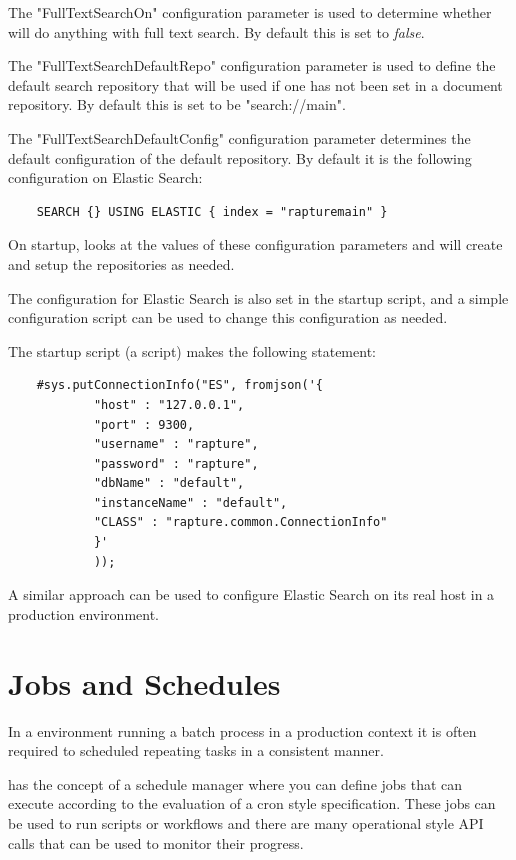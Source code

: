 The "FullTextSearchOn" configuration parameter is used to determine whether \Rapture will do anything with full text search. By default this
is set to \emph{false}.

The "FullTextSearchDefaultRepo" configuration parameter is used to define the default search repository that will be used
if one has not been set in a document repository. By default this is set to be "search://main".

The "FullTextSearchDefaultConfig" configuration parameter determines the default configuration of the default repository. By default it
is the following configuration on Elastic Search:

\begin{Verbatim}
	SEARCH {} USING ELASTIC { index = "rapturemain" }
\end{Verbatim}

On startup, \Rapture looks at the values of these configuration parameters and will create and setup the repositories
as needed.

The configuration for Elastic Search is also set in the startup script, and a simple \Reflex configuration script can be
used to change this configuration as needed.

The startup script (a \Reflex script) makes the following statement:

\begin{lstlisting}
	#sys.putConnectionInfo("ES", fromjson('{
			"host" : "127.0.0.1",
			"port" : 9300,
			"username" : "rapture",
			"password" : "rapture",
			"dbName" : "default",
			"instanceName" : "default",
			"CLASS" : "rapture.common.ConnectionInfo"
			}'
			));
\end{lstlisting}

A similar approach can be used to configure Elastic Search on its real host in a production environment.


\section{Jobs and Schedules}

In a \Rapture environment running a batch process in a production context it is often required to scheduled repeating tasks in a consistent manner.

\Rapture has the concept of a schedule manager where you can define jobs that can execute according to the evaluation of a cron style specification. These jobs
can be used to run scripts or workflows and there are many operational style API calls that can be used to monitor their progress.

